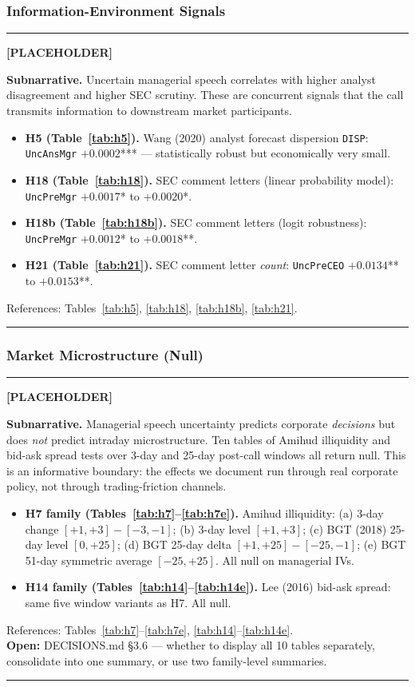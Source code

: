 \documentclass[11pt,a4paper,twocolumn]{article}
\newenvironment{placeholder}{%
  \par\medskip\noindent%
  {\color{placeholderaccent}\rule{\linewidth}{0.4pt}}\par%
  \noindent\textbf{\color{placeholderaccent}[PLACEHOLDER]}\par%
  \smallskip\itshape%
}{%
  \par\upshape\smallskip%
  {\color{placeholderaccent}\rule{\linewidth}{0.4pt}}\par\medskip%
}
\begin{document}
\subsubsection{Information-Environment Signals}
\label{sec:appII_info}
\begin{placeholder}
\textbf{Subnarrative.} Uncertain managerial speech correlates with
higher analyst disagreement and higher SEC scrutiny. These are
concurrent signals that the call transmits information to downstream
market participants.
\begin{itemize}
  \item \textbf{H5 (Table~\ref{tab:h5}).} Wang (2020) analyst forecast
        dispersion \texttt{DISP}: \texttt{UncAnsMgr} $+0.0002$*** ---
        statistically robust but economically very small.
  \item \textbf{H18 (Table~\ref{tab:h18}).} SEC comment letters (linear
        probability model): \texttt{UncPreMgr} $+0.0017$* to
        $+0.0020$*.
  \item \textbf{H18b (Table~\ref{tab:h18b}).} SEC comment letters
        (logit robustness): \texttt{UncPreMgr} $+0.0012$* to
        $+0.0018$**.
  \item \textbf{H21 (Table~\ref{tab:h21}).} SEC comment letter
        \emph{count}: \texttt{UncPreCEO} $+0.0134$** to $+0.0153$**.
\end{itemize}
References: Tables~\ref{tab:h5}, \ref{tab:h18}, \ref{tab:h18b},
\ref{tab:h21}.
\end{placeholder}

\subsubsection{Market Microstructure (Null)}
\label{sec:appII_micro}
\begin{placeholder}
\textbf{Subnarrative.} Managerial speech uncertainty predicts
corporate \emph{decisions} but does \emph{not} predict intraday
microstructure. Ten tables of Amihud illiquidity and bid-ask spread
tests over 3-day and 25-day post-call windows all return null. This
is an informative boundary: the effects we document run through real
corporate policy, not through trading-friction channels.
\begin{itemize}
  \item \textbf{H7 family (Tables~\ref{tab:h7}--\ref{tab:h7e}).}
        Amihud illiquidity: (a) 3-day change $[+1,+3]-[-3,-1]$;
        (b) 3-day level $[+1,+3]$; (c) BGT (2018) 25-day level
        $[0,+25]$; (d) BGT 25-day delta $[+1,+25]-[-25,-1]$;
        (e) BGT 51-day symmetric average $[-25,+25]$. All null on
        managerial IVs.
  \item \textbf{H14 family (Tables~\ref{tab:h14}--\ref{tab:h14e}).}
        Lee (2016) bid-ask spread: same five window variants as
        H7. All null.
\end{itemize}
References: Tables~\ref{tab:h7}--\ref{tab:h7e},
\ref{tab:h14}--\ref{tab:h14e}.\\
\textbf{Open:} DECISIONS.md \S3.6 --- whether to display all 10
tables separately, consolidate into one summary, or use two
family-level summaries.
\end{placeholder}
\end{document}
